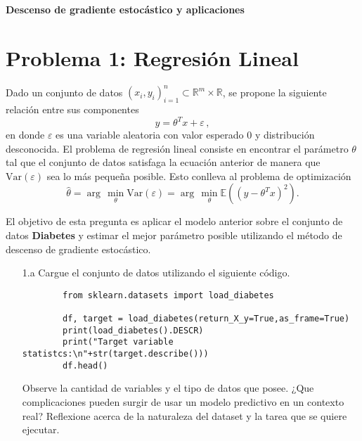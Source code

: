 \vspace{0.3cm}
\begin{center}
{\huge \textbf{Descenso de gradiente estocástico y aplicaciones}}
\end{center}

\section*{Problema 1: Regresión Lineal}

Dado un conjunto de datos $(x_i,y_i)_{i=1}^n\subset\mathbb{R}^m\times\mathbb{R}$, se propone la siguiente relación entre sus componentes
$$y = \theta^Tx + \varepsilon\,,$$
en donde $\varepsilon$ es una variable aleatoria con valor esperado 0 y distribución desconocida. El problema de regresión lineal consiste en encontrar el parámetro $\theta$ tal que el conjunto de datos satisfaga la ecuación anterior de manera que $\mathrm{Var}(\varepsilon)$ sea lo más pequeña posible. Esto conlleva al problema de optimización
\[ \hat{\theta} = \arg\,\min_{\theta} \mathrm{Var}(\varepsilon) = \arg\,\min_{\theta}\mathbb{E}\left((y-\theta^Tx)^2\right).\]

El objetivo de esta pregunta es aplicar el modelo anterior sobre el conjunto de datos \textbf{Diabetes} y estimar el mejor parámetro posible utilizando el método de descenso de gradiente estocástico. 
\begin{enumerate}
    \item[1.a] Cargue el conjunto de datos utilizando el siguiente código.
      \begin{verbatim}
        from sklearn.datasets import load_diabetes

        df, target = load_diabetes(return_X_y=True,as_frame=True)
        print(load_diabetes().DESCR)
        print("Target variable statistcs:\n"+str(target.describe()))
        df.head()
    \end{verbatim}
    Observe la cantidad de variables y el tipo de datos que posee. ¿Que complicaciones pueden surgir de usar un modelo predictivo en un contexto real? Reflexione acerca de la naturaleza del dataset y la tarea que se quiere ejecutar.
\end{enumerate}

